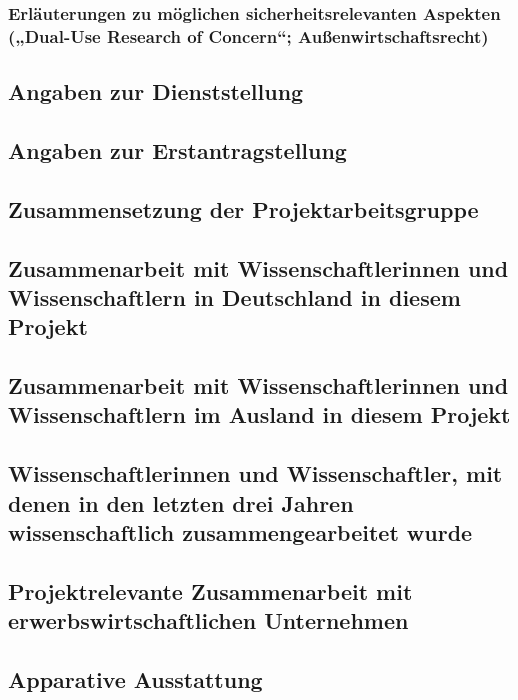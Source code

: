 \documentclass[de]{dfg-proposal}
\begin{document}
            \subsubsection{Erläuterungen zu möglichen sicherheitsrelevanten Aspekten („Dual-Use Research of Concern“; Außenwirtschaftsrecht)}

        \subsection{Angaben zur Dienststellung}

        \subsection{Angaben zur Erstantragstellung}

        \subsection{Zusammensetzung der Projektarbeitsgruppe}

        \subsection{Zusammenarbeit mit Wissenschaftlerinnen und Wissenschaftlern in Deutschland in diesem Projekt}

        \subsection{Zusammenarbeit mit Wissenschaftlerinnen und Wissenschaftlern im Ausland in diesem Projekt}

        \subsection{Wissenschaftlerinnen und Wissenschaftler, mit denen in den letzten drei Jahren wissenschaftlich zusammengearbeitet wurde}

        \subsection{Projektrelevante Zusammenarbeit mit erwerbswirtschaftlichen Unternehmen}

        \subsection{Apparative Ausstattung}
\end{document}
